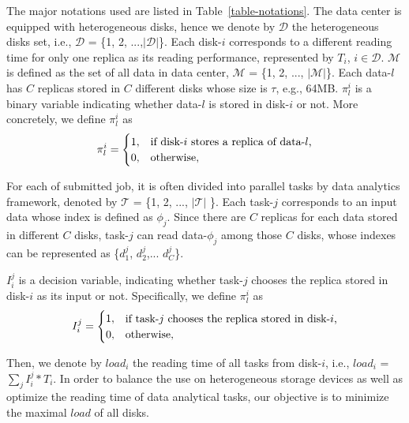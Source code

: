 \documentclass[conference]{IEEEtran}
\makeatletter
\newcommand{\tabincell}[2]{\begin{tabular}{@{}#1@{}}#2\end{tabular}}
\makeatother
\begin{document}
The major notations used are listed in Table~\ref{table-notations}. The data center is equipped with heterogeneous disks, hence we denote by $\mathcal{D}$ the heterogeneous disks set, i.e., $\mathcal{D}$ = \{1, 2, ...,$|\mathcal{D}|$\}. Each disk-$i$ corresponds to a different reading time for only one replica as its reading performance, represented by $T_i$, $i \in \mathcal{D}$.
$\mathcal{M}$ is defined as the set of all data in data center, $\mathcal{M}$ = \{1, 2, ..., $|\mathcal{M}|$\}. Each data-$l$ has $C$ replicas stored in $C$ different disks whose size is $\tau$, e.g., 64MB. $\pi_l^{i}$ is a binary variable indicating whether data-$l$ is stored in disk-$i$ or not. More concretely, we define $\pi_l^{i}$ as
\begin{equation}
\pi_l^{i} =
\begin{cases}
1, &\text{if disk-$i$ stores a replica of data-$l$,}\\
0, &\text{otherwise,}
\end{cases}\nonumber
\vspace{-0.2cm}
\end{equation}

For each of submitted job, it is often divided into parallel tasks by data analytics framework, denoted by $\mathcal{T}$ = \{1, 2,  ..., $\mathcal{|T|}$ \}. Each task-$j$ corresponds to an input data whose index is defined as $\phi_j$. Since there are $C$ replicas for each data stored in different $C$ disks, task-$j$ can read data-$\phi_j$ among those $C$ disks, whose indexes can be represented as \{$d_{1}^j$, $d_{2}^j$,... $d_{C}^j$\}.


$I_i^j$ is a decision variable, indicating whether task-$j$ chooses the replica stored in disk-$i$ as its input or not. Specifically, we define $\pi_l^{i}$ as
\begin{equation}
I_i^j =
\begin{cases}
1, &\text{\tabincell{l}{if task-$j$ chooses the replica stored in disk-$i$,}}\\
0, &\text{otherwise,}
\end{cases}\nonumber
\end{equation}

Then, we denote by $load_i$ the reading time of all tasks from disk-$i$, i.e., $load_{i}$ = $\sum_{j}I_i^j*T_i$. In order to balance the use on heterogeneous storage devices as well as optimize the reading time of data analytical tasks, our objective is to minimize the maximal $load$ of all disks.
\end{document}
